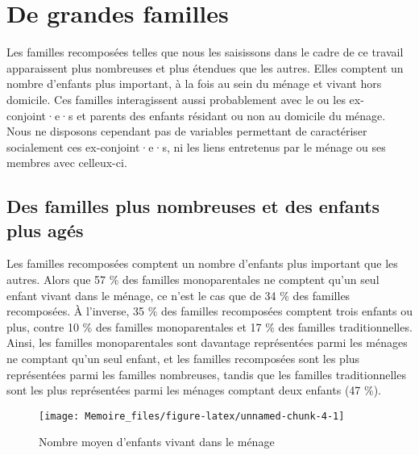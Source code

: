 \documentclass[
  12pt,
]{book}
\begin{document}
\section{De grandes familles}\label{de-grandes-familles}

Les familles recomposées telles que nous les saisissons dans le cadre de
ce travail apparaissent plus nombreuses et plus étendues que les autres.
Elles comptent un nombre d'enfants plus important, à la fois au sein du
ménage et vivant hors domicile. Ces familles interagissent aussi
probablement avec le ou les ex-conjoint·e·s et parents des enfants
résidant ou non au domicile du ménage. Nous ne disposons cependant pas
de variables permettant de caractériser socialement ces ex-conjoint·e·s,
ni les liens entretenus par le ménage ou ses membres avec celleux-ci.

\subsection{Des familles plus nombreuses et des enfants plus
agés}\label{des-familles-plus-nombreuses-et-des-enfants-plus-aguxe9s}

Les familles recomposées comptent un nombre d'enfants plus important que
les autres. Alors que 57 \% des familles monoparentales ne comptent
qu'un seul enfant vivant dans le ménage, ce n'est le cas que de 34 \%
des familles recomposées. À l'inverse, 35 \% des familles recomposées
comptent trois enfants ou plus, contre 10 \% des familles monoparentales
et 17 \% des familles traditionnelles. Ainsi, les familles
monoparentales sont davantage représentées parmi les ménages ne comptant
qu'un seul enfant, et les familles recomposées sont les plus
représentées parmi les familles nombreuses, tandis que les familles
traditionnelles sont les plus représentées parmi les ménages comptant
deux enfants (47 \%).

\begin{figure}[h]

{\centering \texttt{[image: Memoire\_files/figure-latex/unnamed-chunk-4-1]} 

}

\caption{Nombre moyen d'enfants vivant dans le ménage}\label{fig:unnamed-chunk-4}
\end{figure}
\end{document}
